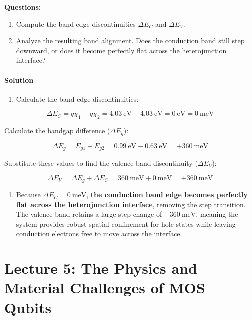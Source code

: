 \documentclass[
]{article}
\providecommand{\tightlist}{%
  \setlength{\itemsep}{0pt}\setlength{\parskip}{0pt}}
\begin{document}
\textbf{Questions:}

\begin{enumerate}
\def\labelenumi{\arabic{enumi}.}
\tightlist
\item
  Compute the band edge discontinuities \(\Delta E_C\) and
  \(\Delta E_V\).
\item
  Analyze the resulting band alignment. Does the conduction band still
  step downward, or does it become perfectly flat across the
  heterojunction interface?
\end{enumerate}

\paragraph{Solution}\label{solution-1}

\begin{enumerate}
\def\labelenumi{\arabic{enumi}.}
\tightlist
\item
  Calculate the band edge discontinuities:
\end{enumerate}

\[\Delta E_C = q\chi_1 - q\chi_2 = 4.03\ \text{eV} - 4.03\ \text{eV} = 0\ \text{eV} = 0\ \text{meV}\]

Calculate the bandgap difference (\(\Delta E_g\)):

\[\Delta E_g = E_{g1} - E_{g2} = 0.99\ \text{eV} - 0.63\ \text{eV} = +360\ \text{meV}\]

Substitute these values to find the valence band discontinuity
(\(\Delta E_V\)):

\[\Delta E_V = \Delta E_g + \Delta E_C = 360\ \text{meV} + 0\ \text{meV} = +360\ \text{meV}\]

\begin{enumerate}
\def\labelenumi{\arabic{enumi}.}
\setcounter{enumi}{1}
\tightlist
\item
  Because \(\Delta E_C = 0\ \text{meV}\), \textbf{the conduction band
  edge becomes perfectly flat across the heterojunction interface},
  removing the step transition. The valence band retains a large step
  change of \(+360\ \text{meV}\), meaning the system provides robust
  spatial confinement for hole states while leaving conduction electrons
  free to move across the interface.
\end{enumerate}

\section{Lecture 5: The Physics and Material Challenges of MOS
Qubits}\label{lecture-5-the-physics-and-material-challenges-of-mos-qubits}
\end{document}
